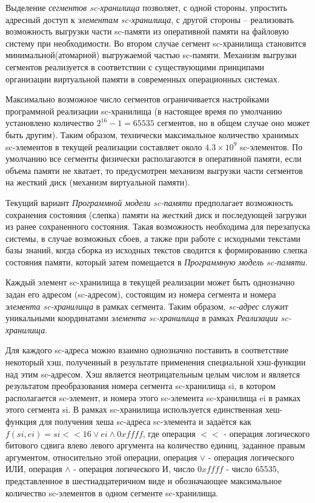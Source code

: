 Выделение \textit{сегментов sc-хранилища} позволяет, с одной стороны, упростить адресный доступ к \textit{элементам
sc-хранилища}, с другой стороны -- реализовать возможность выгрузки части sc-памяти из оперативной памяти на файловую
систему при необходимости. Во втором случае сегмент sc-хранилища становится минимальной(атомарной) выгружаемой частью
sc-памяти. Механизм выгрузки сегментов реализуется в соответствии с существующими принципами организации виртуальной
памяти в современных операционных системах.

Максимально возможное число сегментов ограничивается настройками программной реализации sc-хранилища (в настоящее время
по умолчанию установлено количество $2^{16}-1=65535$ сегментов, но в общем случае оно может быть другим). Таким
образом, технически максимальное количество хранимых sc-элементов в текущей реализации составляет около $4.3 \times
10^{9}$ sc-элементов. По умолчанию все сегменты физически располагаются в оперативной памяти, если объема памяти не
хватает, то предусмотрен механизм выгрузки части сегментов на жесткий диск (механизм виртуальной памяти).

Текущий вариант \textit{Программной модели sc-памяти} предполагает возможность сохранения состояния (слепка) памяти
на жесткий диск и последующей загрузки из ранее сохраненного состояния. Такая возможность необходима для перезапуска
системы, в случае возможных сбоев, а также при работе с исходными текстами базы знаний, когда сборка из исходных текстов
сводится к формированию слепка состояния памяти, который затем помещается в \textit{Программную модель sc-памяти}.

Каждый элемент sc-хранилища в текущей реализации может быть однозначно задан его адресом (sc-адресом), состоящим из
номера сегмента и номера \textit{элемента sc-хранилища} в рамках сегмента. Таким образом, \textit{sc-адрес} служит
уникальными координатами \textit{элемента sc-хранилища} в рамках \textit{Реализации sc-хранилища}.

Для каждого sc-адреса можно взаимно однозначно поставить в соответствие некоторый хэш, полученный в результате применения
специальной хэш-функции над этим sc-адресом. Хэш является неотрицательным целым числом и является результатом
преобразования номера сегмента sc-хранилища si, в котором располагается sc-элемент, и номера этого sc-элемента
sc-хранилища ei в рамках этого сегмента si. В рамках sc-хранилища используется единственная хеш-функция для
получения хеша sc-адреса sc-элемента и задаётся как $f(si, ei) = si << 16 \vee ei \wedge 0xffff$, где операция $<<$ -
операция логического битового сдвига влево левого аргумента на количество единиц, заданное правым аргументом, относительно
этой операции, операция $\vee$ - операция логического ИЛИ, операция $\wedge$ - операция логического И, число $0xffff$ -
число 65535, представленное в шестнадцатеричном виде и обозначающее максимальное количество sc-элементов в одном сегменте
sc-хранилища.

